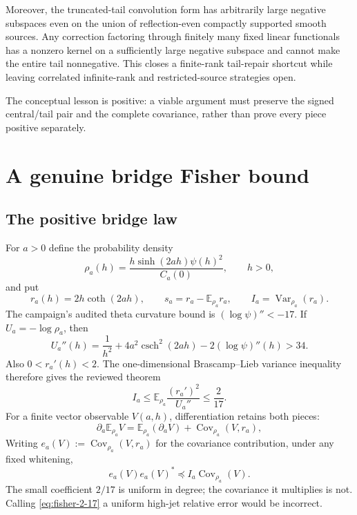 \documentclass[11pt]{article}
\theoremstyle{definition}
\theoremstyle{remark}
\newcommand{\E}{\mathbb{E}}
\newcommand{\Var}{\operatorname{Var}}
\newcommand{\Cov}{\operatorname{Cov}}
\begin{document}
Moreover, the truncated-tail convolution form has arbitrarily large negative
subspaces even on the union of reflection-even compactly supported smooth
sources. Any correction factoring through finitely many fixed linear
functionals has a nonzero kernel on a sufficiently large negative subspace and
cannot make the entire tail nonnegative. This closes a finite-rank tail-repair
shortcut while leaving correlated infinite-rank and restricted-source
strategies open.

The conceptual lesson is positive: a viable argument must preserve the signed
central/tail pair and the complete covariance, rather than prove every piece
positive separately.

\section{A genuine bridge Fisher bound}

\subsection{The positive bridge law}

For $a>0$ define the probability density
\begin{equation}
 \rho_a(h)=\frac{h\sinh(2ah)\psi(h)^2}{C_a(0)},\qquad h>0,
\end{equation}
and put
\begin{equation}
 r_a(h)=2h\coth(2ah),\qquad
 s_a=r_a-\E_{\rho_a}r_a,\qquad
 I_a=\Var_{\rho_a}(r_a).
\end{equation}
The campaign's audited theta curvature bound is
$(\log\psi)''<-17$. If $U_a=-\log\rho_a$, then
\begin{equation}
 U_a''(h)=\frac1{h^2}+4a^2\operatorname{csch}^2(2ah)
          -2(\log\psi)''(h)>34.
\end{equation}
Also $0<r_a'(h)<2$. The one-dimensional Brascamp--Lieb variance inequality
\cite{BrascampLieb1976,CarlenEtAl2013}
therefore gives the reviewed theorem
\begin{equation}
 I_a\le \E_{\rho_a}\frac{(r_a')^2}{U_a''}\le\frac2{17}.
 \label{eq:fisher-2-17}
\end{equation}
For a finite vector observable $V(a,h)$, differentiation retains both pieces:
\begin{equation}
 \partial_a\E_{\rho_a}V
 =\E_{\rho_a}(\partial_aV)+\Cov_{\rho_a}(V,r_a),
\end{equation}
Writing $e_a(V):=\Cov_{\rho_a}(V,r_a)$ for the covariance contribution, under
any fixed whitening,
\begin{equation}
 e_a(V)e_a(V)^*\preceq I_a\Cov_{\rho_a}(V).
\end{equation}
The small coefficient $2/17$ is uniform in degree; the covariance it multiplies
is not. Calling \eqref{eq:fisher-2-17} a uniform high-jet relative error would
be incorrect.
\end{document}
